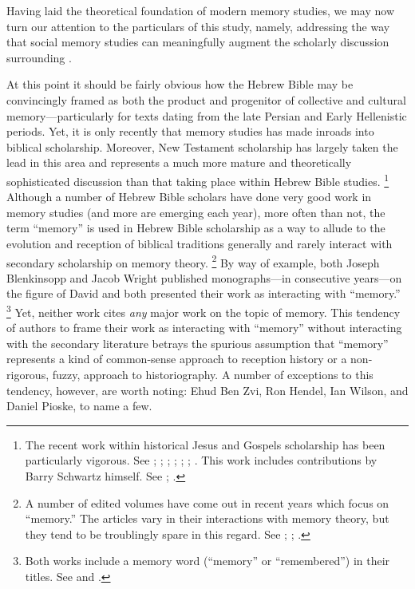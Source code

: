 Having laid the theoretical foundation of modern memory studies, we may now turn our attention to the particulars of this study, namely, addressing the way that social memory studies can meaningfully augment the scholarly discussion surrounding \rwb.%
    \autocite[See also][]{brooke_zsengeller2014}  

At this point it should be fairly obvious how the Hebrew Bible may be convincingly framed as both the product and progenitor of collective and cultural memory---particularly for texts dating from the late Persian and Early Hellenistic periods. Yet, it is only recently that memory studies has made inroads into biblical scholarship. Moreover, New Testament scholarship has largely taken the lead in this area and represents a much more mature and theoretically sophisticated discussion than that taking place within Hebrew Bible studies.%
    \footnote{%
        The recent work within historical Jesus and Gospels scholarship has been particularly vigorous. See 
            \cite{keith_ec2015};
            \cite{keith_ec2015b};
            \cite{thatcher2014};
            \cite{rodriguez2010};
            \cite{ledonne2009};
            \cite{hubenthal_carstens-hasselbalch2012};
            \cite{kirk-thatcher2005}. This work includes contributions by Barry Schwartz himself. See 
            \cite{schwartz_kirk-thatcher2005a};
            \cite{schwartz_kirk-thatcher2005b}.}
Although a number of Hebrew Bible scholars have done very good work in memory studies (and more are emerging each year), more often than not, the term ``memory'' is used in Hebrew Bible scholarship as a way to allude to the evolution and reception of biblical traditions generally and rarely interact with secondary scholarship on memory theory.%
    \footnote{%
        A number of edited volumes have come out in recent years which focus on ``memory.'' The articles vary in their interactions with memory theory, but they tend to be troublingly spare in this regard. See 
        \cite{edelman-benzvi2013};
        \cite{benzvi-levin2012};
        \cite{carstens-hasselbalch2012}.}
By way of example, both Joseph Blenkinsopp and Jacob Wright published monographs---in consecutive years---on the figure of David and both presented their work as interacting with ``memory.''%
    \footnote{%
        Both works include a memory word (``memory'' or ``remembered'') in their titles. See \cite{blenkinsopp2013} and \cite{wright2014}.}
Yet, neither work cites \emph{any} major work on the topic of memory. This tendency of authors to frame their work as interacting with ``memory'' without interacting with the secondary literature betrays the spurious assumption that ``memory'' represents a kind of common-sense approach to reception history or a non-rigorous, fuzzy, approach to historiography. A number of exceptions to this tendency, however, are worth noting: Ehud Ben Zvi, Ron Hendel, Ian Wilson, and Daniel Pioske, to name a few.%
